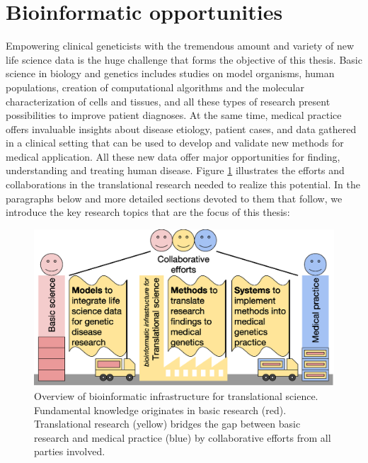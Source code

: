 \section{Bioinformatic opportunities} \label{intro_bioinfopp}

Empowering clinical geneticists with the tremendous amount and variety of new life science data is the huge challenge that forms the objective of this thesis. 
Basic science in biology and genetics includes studies on model organisms, human populations, creation of computational algorithms and the molecular characterization of cells and tissues, and all these types of research present possibilities to improve patient diagnoses.
At the same time, medical practice offers invaluable insights about disease etiology, patient cases, and data gathered in a clinical setting that can be used to develop and validate new methods for medical application.
All these new data offer major opportunities for finding, understanding and treating human disease.
Figure \ref{fig:introduction_overview} illustrates the efforts and collaborations in the translational research needed to realize this potential.
In the paragraphs below and more detailed sections devoted to them that follow, we introduce the key research topics that are the focus of this thesis:

\begin{figure}
\centering
\includegraphics[width=1.0\linewidth]{img/introduction_overview}
\caption[Translational science overview]{Overview of bioinformatic infrastructure for translational science. Fundamental knowledge originates in basic research (red). Translational research (yellow) bridges the gap between basic research and medical practice (blue) by collaborative efforts from all parties involved.}
\label{fig:introduction_overview}
\end{figure}

